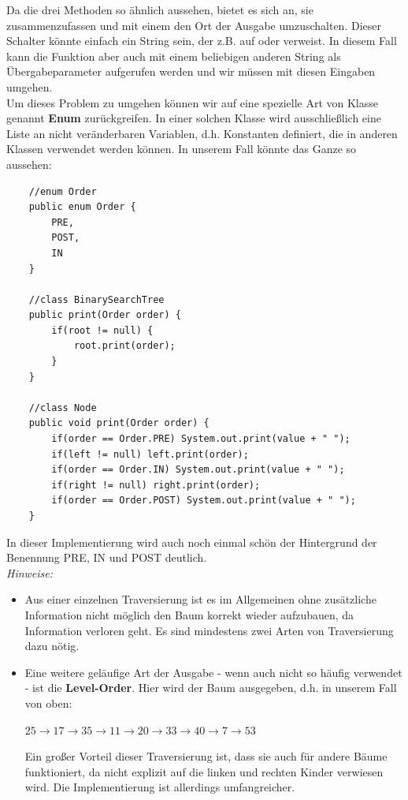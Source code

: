 \documentclass{article}
\begin{document}
Da die drei Methoden so ähnlich aussehen, bietet es sich an, sie zusammenzufassen und mit einem  den Ort der Ausgabe umzuschalten. Dieser Schalter könnte einfach ein String sein, der z.B. auf  oder  verweist. In diesem Fall kann die Funktion aber auch mit einem beliebigen anderen String als Übergabeparameter aufgerufen werden und wir müssen mit diesen Eingaben umgehen.  \\
Um dieses Problem zu umgehen können wir auf eine spezielle Art von Klasse genannt \textbf{Enum} zurückgreifen. In einer solchen Klasse wird ausschließlich eine Liste an nicht veränderbaren Variablen, d.h. Konstanten definiert, die in anderen Klassen verwendet werden können. In unserem Fall könnte das Ganze so aussehen: 
\begin{verbatim}
    //enum Order 
    public enum Order {
        PRE,
        POST, 
        IN
    }

    //class BinarySearchTree 
    public print(Order order) {
        if(root != null) {
            root.print(order);
        }
    }

    //class Node
    public void print(Order order) {
        if(order == Order.PRE) System.out.print(value + " ");
        if(left != null) left.print(order);
        if(order == Order.IN) System.out.print(value + " ");
        if(right != null) right.print(order);
        if(order == Order.POST) System.out.print(value + " ");
    }
\end{verbatim}

In dieser Implementierung wird auch noch einmal schön der Hintergrund der Benennung PRE, IN und POST deutlich. \\
\textit{Hinweise:}
\begin{itemize}
    \item Aus einer einzelnen Traversierung ist es im Allgemeinen ohne zusätzliche Information nicht möglich den Baum korrekt wieder aufzubauen, da Information verloren geht. Es sind mindestens zwei Arten von Traversierung dazu nötig. 
    \item Eine weitere geläufige Art der Ausgabe - wenn auch nicht so häufig verwendet - ist die \textbf{Level-Order}. Hier wird der Baum  ausgegeben, d.h. in unserem Fall von oben:
    \begin{center}
        $25 \rightarrow 17 \rightarrow 35 \rightarrow 11 \rightarrow 20 \rightarrow 33 \rightarrow 40 \rightarrow7 \rightarrow 53$
    \end{center}
    Ein großer Vorteil dieser Traversierung ist, dass sie auch für andere Bäume funktioniert, da nicht explizit auf die linken und rechten Kinder verwiesen wird. Die Implementierung ist allerdings umfangreicher.
\end{itemize}
\end{document}
